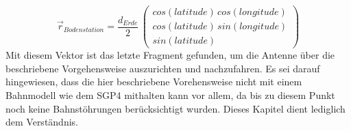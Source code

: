 \begin{equation}
	\vec{r}_{Bodenstation}=\frac{d_{Erde}}{2}\,\left(\begin{array} {c}cos(latitude)\,cos(longitude)\\cos(latitude)\,sin(longitude)\\sin(latitude)\end{array}\right)
\end{equation} 
Mit diesem Vektor ist das letzte Fragment gefunden, um die Antenne über die beschriebene Vorgehensweise auszurichten und nachzufahren. Es sei darauf hingewiesen, dass die hier beschriebene Vorehensweise nicht mit einem Bahnmodell wie dem \ac{SGP4} mithalten kann vor allem, da bis zu diesem Punkt noch keine Bahnstöhrungen berücksichtigt wurden. Dieses Kapitel dient lediglich dem Verständnis.

